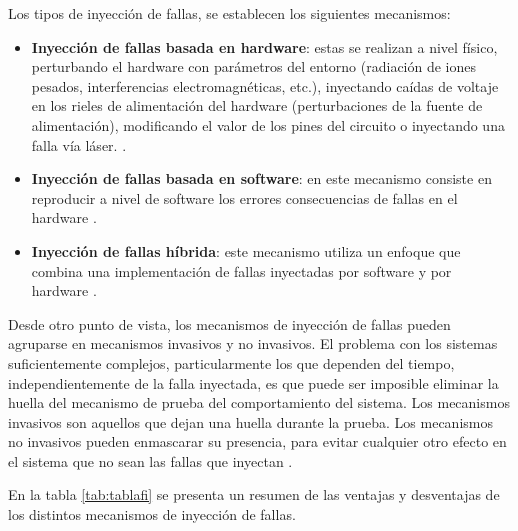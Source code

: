 \par Los tipos de inyección de fallas, se establecen los siguientes mecanismos:
\begin{itemize}
    \item \textbf{Inyección de fallas basada en hardware}: estas se realizan a nivel físico, perturbando el hardware con parámetros del entorno (radiación de iones pesados, interferencias electromagnéticas, etc.), inyectando caídas de voltaje en los rieles de alimentación del hardware (perturbaciones de la fuente de alimentación), modificando el valor de los pines del circuito o inyectando una falla vía láser. \cite{LIB07}.
    \item \textbf{Inyección de fallas basada en software}: en este mecanismo consiste en reproducir a nivel de software los errores consecuencias de fallas en el hardware \cite{LIB05}.
    \item \textbf{Inyección de fallas híbrida}: este mecanismo utiliza un enfoque que combina una implementación de fallas inyectadas por software y por hardware \cite{LIB07}.\\
\end{itemize}
\par Desde otro punto de vista, los mecanismos de inyección de fallas pueden agruparse en mecanismos invasivos y no invasivos. El problema con los sistemas suficientemente complejos, particularmente los que dependen del tiempo, independientemente de la falla inyectada, es que puede ser imposible eliminar la huella del mecanismo de prueba del comportamiento del sistema. Los mecanismos invasivos son aquellos que dejan una huella durante la prueba. Los mecanismos no invasivos pueden enmascarar su presencia, para evitar cualquier otro efecto en el sistema que no sean las fallas que inyectan \cite{LIB05}.\\
\vspace{\baselineskip}

\par En la tabla \ref{tab:tablafi} se presenta un resumen de las ventajas y desventajas de los distintos mecanismos de inyección de fallas.\\


